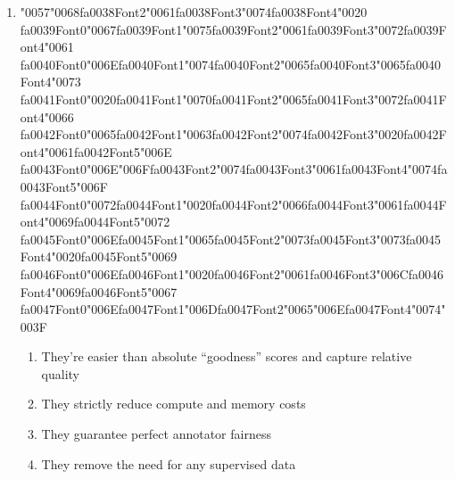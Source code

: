 \documentclass[12pt]{article}
\begin{document}
\begin{enumerate}[label=Q\arabic*.]
\item {\char"0057}{\char"0068}{\csname fa0038Font2\endcsname\char"0061}{\csname fa0038Font3\endcsname\char"0074}{\csname fa0038Font4\endcsname\char"0020} {\csname fa0039Font0\endcsname\char"0067}{\csname fa0039Font1\endcsname\char"0075}{\csname fa0039Font2\endcsname\char"0061}{\csname fa0039Font3\endcsname\char"0072}{\csname fa0039Font4\endcsname\char"0061} {\csname fa0040Font0\endcsname\char"006E}{\csname fa0040Font1\endcsname\char"0074}{\csname fa0040Font2\endcsname\char"0065}{\csname fa0040Font3\endcsname\char"0065}{\csname fa0040Font4\endcsname\char"0073} {\csname fa0041Font0\endcsname\char"0020}{\csname fa0041Font1\endcsname\char"0070}{\csname fa0041Font2\endcsname\char"0065}{\csname fa0041Font3\endcsname\char"0072}{\csname fa0041Font4\endcsname\char"0066} {\csname fa0042Font0\endcsname\char"0065}{\csname fa0042Font1\endcsname\char"0063}{\csname fa0042Font2\endcsname\char"0074}{\csname fa0042Font3\endcsname\char"0020}{\csname fa0042Font4\endcsname\char"0061}{\csname fa0042Font5\endcsname\char"006E} {\csname fa0043Font0\endcsname\char"006E}{\char"006F}{\csname fa0043Font2\endcsname\char"0074}{\csname fa0043Font3\endcsname\char"0061}{\csname fa0043Font4\endcsname\char"0074}{\csname fa0043Font5\endcsname\char"006F} {\csname fa0044Font0\endcsname\char"0072}{\csname fa0044Font1\endcsname\char"0020}{\csname fa0044Font2\endcsname\char"0066}{\csname fa0044Font3\endcsname\char"0061}{\csname fa0044Font4\endcsname\char"0069}{\csname fa0044Font5\endcsname\char"0072} {\csname fa0045Font0\endcsname\char"006E}{\csname fa0045Font1\endcsname\char"0065}{\csname fa0045Font2\endcsname\char"0073}{\csname fa0045Font3\endcsname\char"0073}{\csname fa0045Font4\endcsname\char"0020}{\csname fa0045Font5\endcsname\char"0069} {\csname fa0046Font0\endcsname\char"006E}{\csname fa0046Font1\endcsname\char"0020}{\csname fa0046Font2\endcsname\char"0061}{\csname fa0046Font3\endcsname\char"006C}{\csname fa0046Font4\endcsname\char"0069}{\csname fa0046Font5\endcsname\char"0067} {\csname fa0047Font0\endcsname\char"006E}{\csname fa0047Font1\endcsname\char"006D}{\csname fa0047Font2\endcsname\char"0065}{\char"006E}{\csname fa0047Font4\endcsname\char"0074}{\char"003F}
\begin{enumerate}[label=(\Alph*)]
    \item They're easier than absolute ``goodness'' scores and capture relative quality
    \item They strictly reduce compute and memory costs
    \item They guarantee perfect annotator fairness
    \item They remove the need for any supervised data

\end{enumerate}
\end{enumerate}
\end{document}
